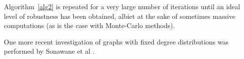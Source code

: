 \documentclass[11pt]{article}
\begin{document}
Algorithm~\ref{alg2} is repeated for a very large number of iterations until an ideal level of robustness has been obtained, albiet at the sake of sometimes massive computations (as is the case with Monte-Carlo methods).


One more recent investigation of graphs with fixed degree distributions was performed by Sonawane et al \cite{bimodal}. 




\end{document}

